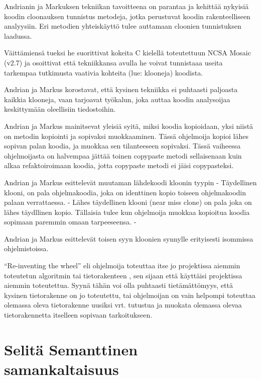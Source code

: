 \documentclass[finnish]{../tktltiki2}
\theoremstyle{definition}
\theoremstyle{remark}
\begin{document}
Andrianin ja Markuksen tekniikan tavoitteena on parantaa ja kehittää nykyisiä koodin cloonauksen tunnistus metodeja,
jotka perustuvat koodin rakenteelliseen analyysiin.
Eri metodien yhteiskäyttö tulee auttamaan cloonien tunnistuksen laadussa.


Väittämiensä tueksi he suorittivat kokeita C kielellä toteutettuun NCSA Mosaic (v2.7) ja osoittivat että tekniikkansa
avulla he voivat tunnistaaa useita tarkempaa
tutkimusta vaativia kohteita (lue: klooneja) koodista.

Andrian ja Markus korostavat, että kysinen tekniikka ei puhtaasti paljoasta kaikkia klooneja, vaan tarjoavat työkalun,
joka auttaa koodin analysoijaa keskittymään oleellisiin tiedostoihin.


Andrian ja Markus mainitsevat yleisiä syitä, miksi koodia kopioidaan, yksi niistä on metodin kopiointi ja sopivaksi
muokkaaminen. Tässä ohjelmoija kopioi lähes sopivan palan koodia, ja muokkaa sen tilanteeseen sopivaksi. Tässä
vaiheessa ohjelmoijasta on halvempaa jättää toinen copypaste metodi sellaisenaan kuin alkaa refaktoiroimaan koodia,
jotta copypaste metodi ei jäisi copypasteksi.


Andrian ja Markus esittelevät muutaman lähdekoodi kloonin tyypin
- Täydellinen klooni, on pala ohjelmakoodia, joka on identtinen kopio toiseen ohjelmakoodin palaan verrattaessa.
- Lähes täydellinen klooni (near miss clone) on pala joka on lähes täydllinen kopio. Tällaisia tulee kun ohjelmoija
muokkaa kopioitua koodia sopimaan paremmin omaan tarpeeseensa.
-


Andrian ja Markus esittelevät toisen syyn kloonien synnylle erityisesti isommissa ohjelmistoissa.

``Re-inventing the wheel'' eli ohjelmoija toteuttaa itse jo projektissa aiemmin toteutetun algoritmin tai tietorakenteen
, sen sijaan että käyttäisi projektissa aiemmin toteutettua. Syynä tähän voi olla puhtaasti tietämättömyys, että kysinen
tietorakenne on jo toteutettu, tai ohjelmoijan on vain helpompi toteuttaa olemassa oleva tietorakenne uusiksi vrt.
tutustua ja muokata olemassa olevaa tietorakennetta itselleen sopivaan tarkoitukseen.










\section{Selitä Semanttinen samankaltaisuus}



















\end{document}
